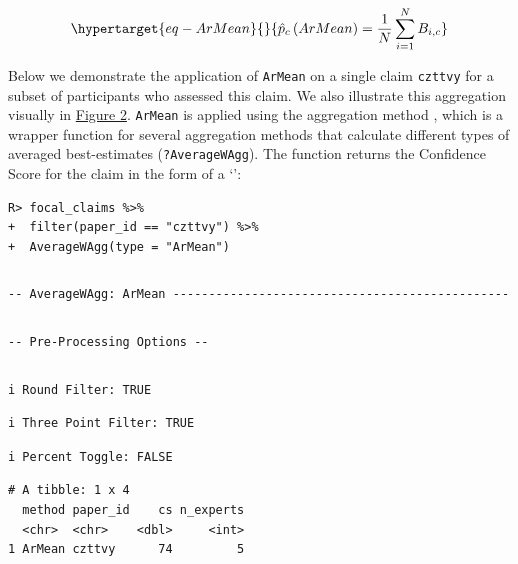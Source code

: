 \documentclass[article]{jss}
\newcommand{\class}[1]{`\code{#1}'}
\newcommand{\fct}[1]{\code{#1()}}
\begin{document}
\begin{equation}\protect\hypertarget{eq-ArMean}{}{
\hat{p}_c\left(ArMean \right ) = \frac{1}{N}\sum_{i=1}^N B_{i,c}
}\label{eq-ArMean}\end{equation}

Below we demonstrate the application of \texttt{ArMean} on a single
claim \texttt{czttvy} for a subset of participants who assessed this
claim. We also illustrate this aggregation visually in
\protect\hyperlink{fig-ArMean}{Figure 2}. \texttt{ArMean} is applied
using the aggregation method \fct{AverageWAgg}, which is a wrapper
function for several aggregation methods that calculate different types
of averaged best-estimates (\texttt{?AverageWAgg}). The function returns
the Confidence Score for the claim in the form of a \class{tibble}:

\begin{verbatim}
R> focal_claims %>% 
+  filter(paper_id == "czttvy") %>%
+  AverageWAgg(type = "ArMean")
\end{verbatim}

\begin{verbatim}
\end{verbatim}

\begin{verbatim}
-- AverageWAgg: ArMean -----------------------------------------------
\end{verbatim}

\begin{verbatim}
\end{verbatim}

\begin{verbatim}
-- Pre-Processing Options --
\end{verbatim}

\begin{verbatim}
\end{verbatim}

\begin{verbatim}
i Round Filter: TRUE
\end{verbatim}

\begin{verbatim}
i Three Point Filter: TRUE
\end{verbatim}

\begin{verbatim}
i Percent Toggle: FALSE
\end{verbatim}

\begin{verbatim}
# A tibble: 1 x 4
  method paper_id    cs n_experts
  <chr>  <chr>    <dbl>     <int>
1 ArMean czttvy      74         5
\end{verbatim}
\end{document}

